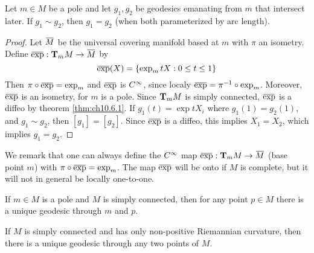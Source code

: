 \documentclass[../main]{subfiles}
\begin{document}
\begin{theorem} \label{thm:ch10.7.4}
Let $m\in M$ be a pole and let $g_1,g_2$ be geodesics emanating from $m$ that intersect later. If $g_1\sim g_2$, then $g_1=g_2$ (when both parameterized by arc length).
\end{theorem}

\begin{proof}
Let $\xoverline M$ be the universal covering manifold based at $m$ with $\pi$ an isometry. Define $\xoverline\exp:\ts Mm\functionMaps\xoverline M$ by
\[\xoverline\exp(X) = \brc{\exp_mtX: 0\le t\le 1}\]
Then $\pi\circ\xoverline\exp=\exp_m$ and $\xoverline\exp$ is $\CInfty$, since localy $\xoverline\exp=\pi\inv\circ\exp_m$. Moreover, $\xoverline\exp$ is an isometry, for $m$ is a pole. Since $\ts Mm$ is simply connected, $\xoverline\exp$ is a diffeo by theorem \ref{thm:ch10.6.1}. If $g_1(t)=\exp tX_i$ where $g_1(1)=g_2(1)$, and $g_1\sim g_2$, then $[g_1]=[g_2]$. Since $\xoverline\exp$ is a diffeo, this implies $X_1=X_2$, which implies $g_1=g_2$.
\end{proof}



We remark that one can always define the $\CInfty$ map $\xoverline\exp:\ts Mm\functionMaps\xoverline M$ (base point $m$) with $\pi\circ\xoverline\exp=\exp_m$. The map $\xoverline\exp$ will be onto if $M$ is complete, but it will not in general be locally one-to-one.



\begin{corollary} \label{cor:ch10.7.5}
If $m\in M$ is a pole and $M$ is simply connected, then for any point $p\in M$ there is a unique geodesic through $m$ and $p$.
\end{corollary}



\begin{corollary} \label{cor:ch10.7.6}
If $M$ is simply connected and has only non-positive Riemannian curvature, then there is a unique geodesic through any two points of $M$.
\end{corollary}
\end{document}
